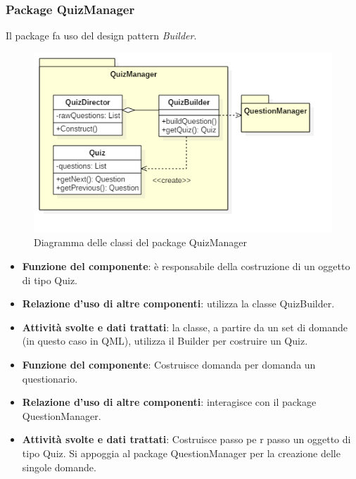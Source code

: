 \subsubsection{Package QuizManager}
Il package fa uso del design pattern \emph{Builder}.
\begin{figure}[h!]
\begin{center}
	\includegraphics[scale=0.65]{../images/QuizManagerClass.png}
	\caption{Diagramma delle classi del package QuizManager}
\end{center}
\end{figure}
\begin{itemize}
\item\textbf{Funzione del componente}: è responsabile della costruzione di un oggetto di tipo Quiz.
	\item\textbf{Relazione d'uso di altre componenti}: utilizza la classe QuizBuilder.
	\item\textbf{Attività svolte e dati trattati}: la classe, a partire da un set di domande (in questo caso in QML), utilizza il Builder per costruire un Quiz.
\end{itemize}

\begin{itemize}
\item\textbf{Funzione del componente}: Costruisce domanda per domanda un questionario.
	\item\textbf{Relazione d'uso di altre componenti}: interagisce con il package QuestionManager.
	\item\textbf{Attività svolte e dati trattati}: Costruisce passo pe r passo un oggetto di tipo Quiz. Si appoggia al package QuestionManager per la creazione delle singole domande.
\end{itemize}

